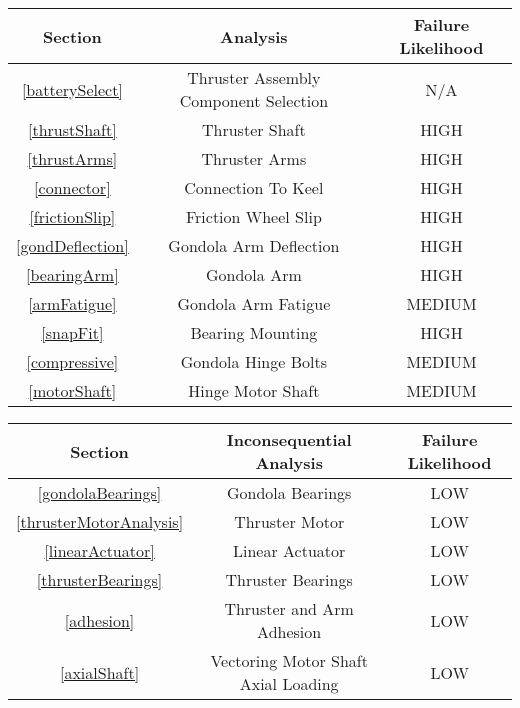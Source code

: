 \documentclass[../main.tex]{subfiles}
\begin{document}
\begin{center}
	\begin{tabular}{|c|c|c|}
	\hline
	\textbf{Section} &\textbf{Analysis} & \textbf{Failure Likelihood} \\
	\hline
	\ref{batterySelect} & Thruster Assembly Component Selection& \cellcolor{white}N/A \\
	\hline
	\ref{thrustShaft} & Thruster Shaft & \cellcolor{black}\color{white}HIGH \\
	\hline
	\ref{thrustArms} & Thruster Arms & \cellcolor{black}\color{white}HIGH \\
	\hline
	\ref{connector} & Connection To Keel & \cellcolor{black}\color{white}HIGH \\
	\hline
	\ref{frictionSlip} & Friction Wheel Slip & \cellcolor{black}\color{white}HIGH \\
	\hline
	\ref{gondDeflection} & Gondola Arm Deflection & \cellcolor{black}\color{white}HIGH \\
	\hline
	\ref{bearingArm} & Gondola Arm & \cellcolor{black}\color{white}HIGH \\
	\hline
	\ref{armFatigue} & Gondola Arm Fatigue & \cellcolor{gray}MEDIUM \\
	\hline
	\ref{snapFit} & Bearing Mounting & \cellcolor{black}\color{white}HIGH \\
	\hline
	\ref{compressive} & Gondola Hinge Bolts & \cellcolor{gray}MEDIUM \\
	\hline
	\ref{motorShaft} & Hinge Motor Shaft & \cellcolor{gray}MEDIUM \\
	\hline
	\end{tabular}
\end{center}

\begin{center}
	\begin{tabular}{|c|c|c|}
	\hline
	\textbf{Section} &\textbf{Inconsequential Analysis} & \textbf{Failure Likelihood} \\
	\hline
	\ref{gondolaBearings} & Gondola Bearings & LOW \\
	\hline
	\ref{thrusterMotorAnalysis} & Thruster Motor & LOW \\
	\hline
	\ref{linearActuator} & Linear Actuator & LOW \\
	\hline
	\ref{thrusterBearings} & Thruster Bearings & LOW \\
	\hline
	\ref{adhesion} & Thruster and Arm Adhesion & LOW \\
	\hline
	\ref{axialShaft} & Vectoring Motor Shaft Axial Loading & LOW \\
	\hline
	\end{tabular}
\end{center}
\end{document}
